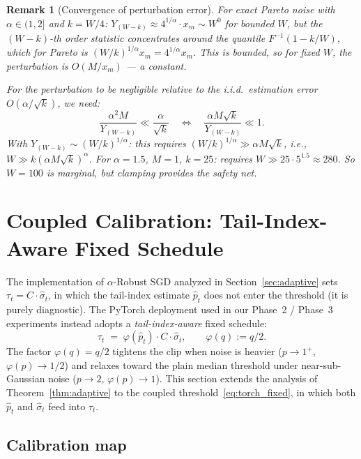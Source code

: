 \documentclass[11pt]{article}
\newtheorem{remark}[theorem]{Remark}
\theoremstyle{definition}
\newcommand{\phat}{\hat{p}}
\newcommand{\shat}{\hat{\sigma}}
\begin{document}
\begin{remark}[Convergence of perturbation error]\label{rem:perturbation_rate}
For exact Pareto noise with $\alpha \in (1, 2]$ and $k = W/4$:
$Y_{(W-k)} \approx 4^{1/\alpha} \cdot x_m \sim W^0$ for bounded $W$,
but the $(W-k)$-th order statistic concentrates around the quantile
$F^{-1}(1-k/W)$, which for Pareto is $(W/k)^{1/\alpha} x_m = 4^{1/\alpha} x_m$.
This is bounded, so for fixed $W$, the perturbation is $O(M/x_m)$
--- a constant.

For the perturbation to be negligible relative to the i.i.d.\ estimation
error $O(\alpha/\sqrt{k})$, we need:
\[
  \frac{\alpha^2 M}{Y_{(W-k)}} \ll \frac{\alpha}{\sqrt{k}}
  \quad\Longleftrightarrow\quad
  \frac{\alpha M \sqrt{k}}{Y_{(W-k)}} \ll 1.
\]
With $Y_{(W-k)} \sim (W/k)^{1/\alpha}$: this requires
$(W/k)^{1/\alpha} \gg \alpha M \sqrt{k}$, i.e.,
$W \gg k(\alpha M \sqrt{k})^\alpha$.
For $\alpha = 1.5$, $M = 1$, $k = 25$: requires $W \gg 25 \cdot 5^{1.5} \approx 280$.
So $W = 100$ is marginal, but clamping provides the safety net.
\end{remark}


\section{Coupled Calibration: Tail-Index-Aware Fixed Schedule}
\label{sec:coupled}

The implementation of $\alpha$-Robust SGD analyzed in Section~\ref{sec:adaptive}
sets $\tau_t = C \cdot \shat_t$, in which the tail-index estimate $\phat_t$
does not enter the threshold (it is purely diagnostic). The PyTorch deployment
used in our Phase~2 / Phase~3 experiments instead adopts a
\emph{tail-index-aware} fixed schedule:
\begin{equation}\label{eq:torch_fixed}
  \tau_t \;=\; \varphi(\phat_t) \cdot C \cdot \shat_t,
  \qquad \varphi(q) := q/2.
\end{equation}
The factor $\varphi(q) = q/2$ tightens the clip when noise is heavier
($p \to 1^+$, $\varphi(p) \to 1/2$) and relaxes toward the plain median
threshold under near-sub-Gaussian noise ($p \to 2$, $\varphi(p) \to 1$).
This section extends the analysis of Theorem~\ref{thm:adaptive} to the
coupled threshold~\eqref{eq:torch_fixed}, in which both $\phat_t$ and
$\shat_t$ feed into $\tau_t$.

\subsection{Calibration map}
\label{ssec:phi}
\end{document}
